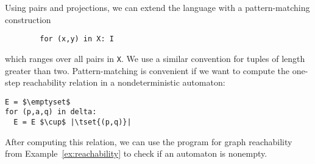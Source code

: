 \begin{myexample} Using pairs and  projections, we can extend the language with a pattern-matching construction
	\begin{verbatim}
		for (x,y) in X: I
	\end{verbatim}
	which ranges over all pairs in  \texttt{X}. We use a similar convention for tuples of length greater than two. Pattern-matching is convenient if we want to compute the one-step reachability relation in a nondeterministic automaton:
		\begin{lstlisting}			
E = $\emptyset$
for (p,a,q) in delta:
  E = E $\cup$ |\tset{(p,q)}|
		\end{lstlisting}
	After computing this relation, we can use the program for graph reachability from Example~\ref{ex:reachability} to check if an automaton is nonempty.
\end{myexample}


